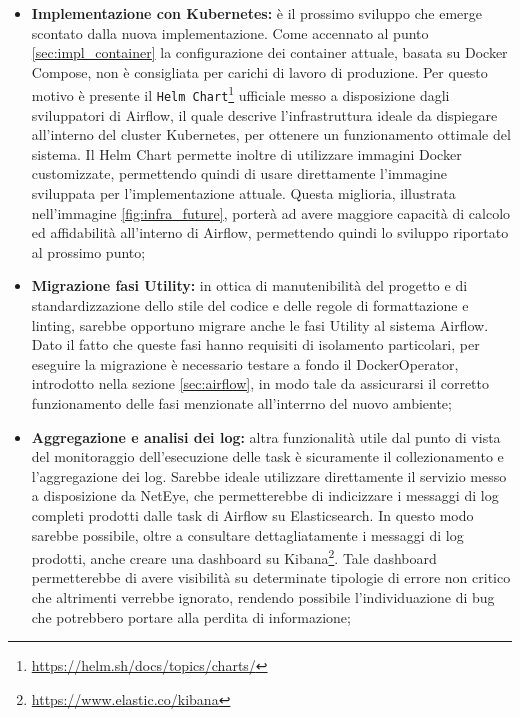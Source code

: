 \begin{itemize}
  \item \textbf{Implementazione con Kubernetes:} è il prossimo sviluppo che
    emerge scontato dalla nuova implementazione. Come accennato al punto \ref{sec:impl_container}
    la configurazione dei container attuale, basata su Docker Compose, non è consigliata
    per carichi di lavoro di produzione. Per questo motivo è presente il \texttt{Helm
    Chart}\footnote{\url{https://helm.sh/docs/topics/charts/}} ufficiale messo a
    disposizione dagli sviluppatori di Airflow, il quale descrive l'infrastruttura
    ideale da dispiegare all'interno del cluster Kubernetes, per ottenere un
    funzionamento ottimale del sistema. Il Helm Chart permette inoltre di utilizzare
    immagini Docker customizzate, permettendo quindi di usare direttamente l'immagine
    sviluppata per l'implementazione attuale. Questa miglioria, illustrata nell'immagine
    \ref{fig:infra_future}, porterà ad avere maggiore capacità di calcolo ed affidabilità
    all'interno di Airflow, permettendo quindi lo sviluppo riportato al prossimo
    punto;

  \item \textbf{Migrazione fasi Utility:} in ottica di manutenibilità del
    progetto e di standardizzazione dello stile del codice e delle regole di
    formattazione e linting, sarebbe opportuno migrare anche le fasi Utility al sistema
    Airflow. Dato il fatto che queste fasi hanno requisiti di isolamento
    particolari, per eseguire la migrazione è necessario testare a fondo il DockerOperator,
    introdotto nella sezione \ref{sec:airflow}, in modo tale da assicurarsi il corretto
    funzionamento delle fasi menzionate all'interrno del nuovo ambiente;

  \item \textbf{Aggregazione e analisi dei log:} altra funzionalità utile dal
    punto di vista del monitoraggio dell'esecuzione delle task è sicuramente il
    collezionamento e l'aggregazione dei log. Sarebbe ideale utilizzare direttamente
    il servizio messo a disposizione da NetEye, che permetterebbe di indicizzare
    i messaggi di log completi prodotti dalle task di Airflow su Elasticsearch. In
    questo modo sarebbe possibile, oltre a consultare dettagliatamente i
    messaggi di log prodotti, anche creare una dashboard su Kibana\footnote{\url{https://www.elastic.co/kibana}}.
    Tale dashboard permetterebbe di avere visibilità su determinate tipologie di
    errore non critico che altrimenti verrebbe ignorato, rendendo possibile l'individuazione
    di bug che potrebbero portare alla perdita di informazione;


\end{itemize}
